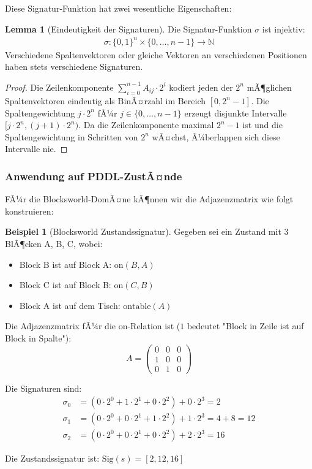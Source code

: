 ﻿\documentclass[a4paper,12pt]{article}
\theoremstyle{definition}
\newtheorem{beispiel}{Beispiel}[section]
\newtheorem{lemma}{Lemma}[section]
\begin{document}
Diese Signatur-Funktion hat zwei wesentliche Eigenschaften:

\begin{lemma}[Eindeutigkeit der Signaturen]
	Die Signatur-Funktion $\sigma$ ist injektiv:
	\begin{align}
	\sigma: \{0,1\}^n \times \{0,\ldots,n-1\} \to \mathbb{N}
	\end{align}
	Verschiedene Spaltenvektoren oder gleiche Vektoren an verschiedenen Positionen haben stets verschiedene Signaturen.
\end{lemma}

\begin{proof}
	Die Zeilenkomponente $\sum_{i=0}^{n-1} A_{ij} \cdot 2^i$ kodiert jeden der $2^n$ mÃ¶glichen Spaltenvektoren eindeutig als BinÃ¤rzahl im Bereich $[0, 2^n-1]$. Die Spaltengewichtung $j \cdot 2^n$ fÃ¼r $j \in \{0,\ldots,n-1\}$ erzeugt disjunkte Intervalle $[j \cdot 2^n, (j+1) \cdot 2^n)$. Da die Zeilenkomponente maximal $2^n - 1$ ist und die Spaltengewichtung in Schritten von $2^n$ wÃ¤chst, Ã¼berlappen sich diese Intervalle nie.
\end{proof}

\subsubsection{Anwendung auf PDDL-ZustÃ¤nde}

FÃ¼r die Blocksworld-DomÃ¤ne kÃ¶nnen wir die Adjazenzmatrix wie folgt konstruieren:

\begin{beispiel}[Blocksworld Zustandssignatur]
	Gegeben sei ein Zustand mit 3 BlÃ¶cken A, B, C, wobei:
	\begin{itemize}
		\item[-] Block B ist auf Block A: $\text{on}(B, A)$
		\item[-] Block C ist auf Block B: $\text{on}(C, B)$
		\item[-] Block A ist auf dem Tisch: $\text{ontable}(A)$
	\end{itemize}
	
	Die Adjazenzmatrix fÃ¼r die on-Relation ist ($1$ bedeutet "Block in Zeile ist auf Block in Spalte"):
	\[
	A = \begin{pmatrix}
	0 & 0 & 0 \\
	1 & 0 & 0 \\
	0 & 1 & 0
	\end{pmatrix}
	\]
	
	Die Signaturen sind:
	\begin{align*}
	\sigma_0 &= (0 \cdot 2^0 + 1 \cdot 2^1 + 0 \cdot 2^2) + 0 \cdot 2^3 = 2 \\
	\sigma_1 &= (0 \cdot 2^0 + 0 \cdot 2^1 + 1 \cdot 2^2) + 1 \cdot 2^3 = 4 + 8 = 12 \\
	\sigma_2 &= (0 \cdot 2^0 + 0 \cdot 2^1 + 0 \cdot 2^2) + 2 \cdot 2^3 = 16
	\end{align*}
	
	Die Zustandssignatur ist: $\text{Sig}(s) = [2, 12, 16]$
\end{beispiel}
\end{document}
